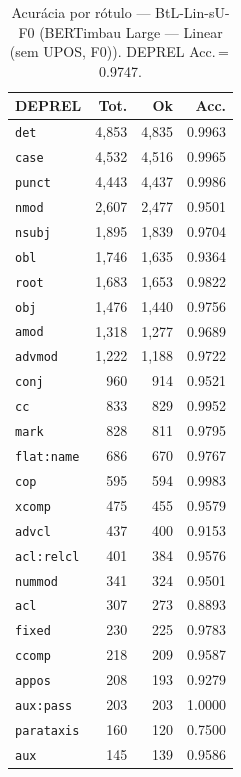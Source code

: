 \begin{table}[ht]
\centering
\caption{Acurácia por rótulo --- BtL-Lin-sU-F0 (BERTimbau Large — Linear (sem UPOS, F0)). DEPREL Acc.\,=\,0.9747.}
\label{tab:acc-predict-test-ablacao-linear-neuralmind-bert-large-portuguese-cased-fold0}
\scriptsize
\begin{tabular}{lrrr}
\toprule
\textbf{DEPREL} & \textbf{Tot.} & \textbf{Ok} & \textbf{Acc.} \\
\midrule
\texttt{det} & 4,853 & 4,835 & 0.9963 \\
\texttt{case} & 4,532 & 4,516 & 0.9965 \\
\texttt{punct} & 4,443 & 4,437 & 0.9986 \\
\texttt{nmod} & 2,607 & 2,477 & 0.9501 \\
\texttt{nsubj} & 1,895 & 1,839 & 0.9704 \\
\texttt{obl} & 1,746 & 1,635 & 0.9364 \\
\texttt{root} & 1,683 & 1,653 & 0.9822 \\
\texttt{obj} & 1,476 & 1,440 & 0.9756 \\
\texttt{amod} & 1,318 & 1,277 & 0.9689 \\
\texttt{advmod} & 1,222 & 1,188 & 0.9722 \\
\texttt{conj} & 960 & 914 & 0.9521 \\
\texttt{cc} & 833 & 829 & 0.9952 \\
\texttt{mark} & 828 & 811 & 0.9795 \\
\texttt{flat\!:\!name} & 686 & 670 & 0.9767 \\
\texttt{cop} & 595 & 594 & 0.9983 \\
\texttt{xcomp} & 475 & 455 & 0.9579 \\
\texttt{advcl} & 437 & 400 & 0.9153 \\
\texttt{acl\!:\!relcl} & 401 & 384 & 0.9576 \\
\texttt{nummod} & 341 & 324 & 0.9501 \\
\texttt{acl} & 307 & 273 & 0.8893 \\
\texttt{fixed} & 230 & 225 & 0.9783 \\
\texttt{ccomp} & 218 & 209 & 0.9587 \\
\texttt{appos} & 208 & 193 & 0.9279 \\
\texttt{aux\!:\!pass} & 203 & 203 & 1.0000 \\
\texttt{parataxis} & 160 & 120 & 0.7500 \\
\texttt{aux} & 145 & 139 & 0.9586 \\

\end{tabular}
\end{table}
